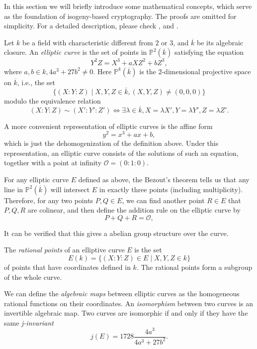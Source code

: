 
In this section we will briefly introduce some mathematical concepts, which serve as the foundation of isogeny-based cryptography. The proofs are omitted for simplicity. For a detailed description, please check \cite{Silverman}, \cite{https://doi.org/10.48550/arxiv.1711.04062} and \cite{PQCRYPTO:JaoDeFo11}.

\begin{definition}
Let $k$ be a field with characteristic different from $2$ or $3$, and $\overline k$ be its algebraic closure. An \textit{elliptic curve} is the set of points in $\mathbb P^2(\overline k)$ satisfying the equation
$$
Y^2Z=X^3+aXZ^2+bZ^3,
$$
where $a,b\in k,4a^3+27b^2\ne 0$. Here $\mathbb P^k(\overline k)$ is the $2$-dimensional projective space on $\overline k$, i.e., the set
$$
\{(X:Y:Z)\mid X,Y,Z\in\overline k,(X,Y,Z)\ne(0,0,0)\}
$$
modulo the equivalence relation
$$
(X:Y:Z)\sim(X':Y':Z')\Leftrightarrow \exists \lambda\in\overline k,X=\lambda X',Y=\lambda Y',Z=\lambda Z'.
$$

\end{definition}


A more convenient representation of elliptic curves is the affine form
$$
y^2=x^3+ax+b,
$$
which is just the dehomogenization of the definition above. Under this representation, an elliptic curve consists of the solutions of such an equation, together with a point at infinity $\mathcal O=(0:1:0)$.

For any elliptic curve $E$ defined as above, the Bezout's theorem tells us that any line in $\mathbb P^2(\overline k)$ will intersect $E$ in exactly three points (including multiplicity). Therefore, for any two points $P,Q\in E$, we can find another point $R\in E$ that $P,Q,R$ are colinear, and then define the addition rule on the elliptic curve by
$$
P+Q+R=\mathcal{O},
$$

It can be verified that this gives a abelian group structure over the curve.

\begin{definition} The \textit{rational points} of an elliptive curve $E$ is the set
$$
E(k)=\{(X:Y:Z)\in E\mid X,Y,Z\in k\}
$$
of points that have coordinates defined in $k$. The rational points form a subgroup of the whole curve.

\end{definition}

\begin{definition} We can define the \textit{algebraic maps} between elliptic curves as the homogeneous rational functions on their coordinates. An \textit{isomorphism} between two curves is an invertible algebraic map. Two curves are isomorphic if and only if they have the same \textit{j-invariant}
$$
j(E)=1728\frac{4a^3}{4a^3+27b^2}.
$$
\end{definition}

